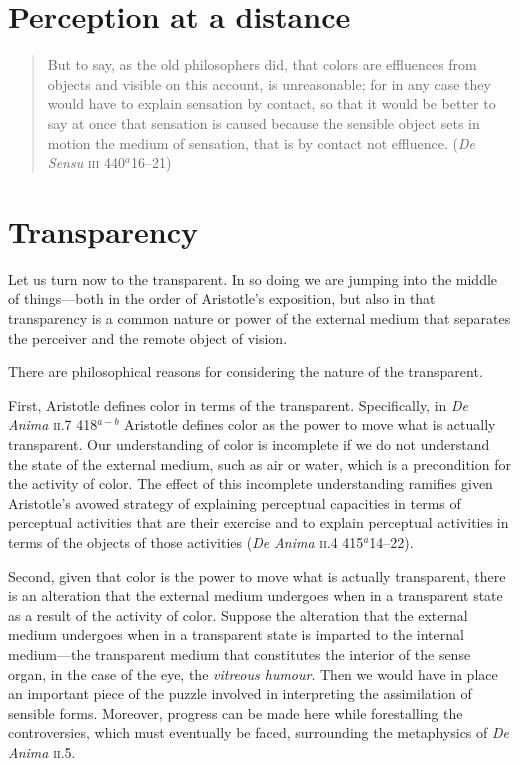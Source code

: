 \documentclass[12pt]{article}
\begin{document}

\section{Perception at a distance} %
\label{sec:perception_at_a_distance}

\begin{quote}
	But to say, as the old philosophers did, that colors are effluences from objects and visible on this account, is unreasonable; for in any case they would have to explain sensation by contact, so that it would be better to say at once that sensation is caused because the sensible object sets in motion the medium of sensation, that is by contact not effluence. (\emph{De Sensu} \textsc{iii} 440\( ^{a} \)16--21)
\end{quote}


\section{Transparency} %
\label{sec:transparency}

Let us turn now to the transparent. In so doing we are jumping into the middle of things---both in the order of Aristotle's exposition, but also in that transparency is a common nature or power of the external medium that separates the perceiver and the remote object of vision.

There are philosophical reasons for considering the nature of the transparent.

First, Aristotle defines color in terms of the transparent. Specifically, in \emph{De Anima} \textsc{ii}.7 418\( ^{a-b} \) Aristotle defines color as the power to move what is actually transparent. Our understanding of color is incomplete if we do not understand the state of the external medium, such as air or water, which is a precondition for the activity of color. The effect of this incomplete understanding ramifies given Aristotle's avowed strategy of explaining perceptual capacities in terms of perceptual activities that are their exercise and to explain perceptual activities in terms of the objects of those activities (\emph{De Anima} \textsc{ii}.4 415\( ^{a} \)14--22).

Second, given that color is the power to move what is actually transparent, there is an alteration that the external medium undergoes when in a transparent state as a result of the activity of color. Suppose the alteration that the external medium undergoes when in a transparent state is imparted to the internal medium---the transparent medium that constitutes the interior of the sense organ, in the case of the eye, the \emph{vitreous humour}. Then we would have in place an important piece of the puzzle involved in interpreting the assimilation of sensible forms. Moreover, progress can be made here while forestalling the controversies, which must eventually be faced, surrounding the metaphysics of \emph{De Anima} \textsc{ii}.5.
\end{document}
